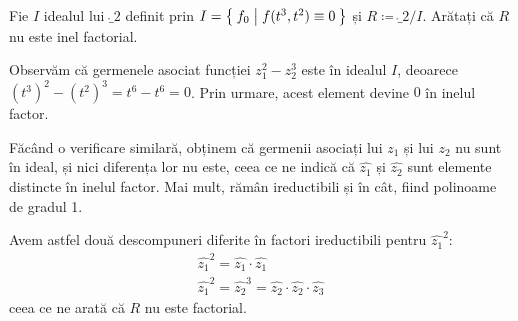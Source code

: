 \begin{problem}
Fie \(I\) idealul lui \(\ring_2\) definit prin \(I = \Set{ f_0 | f(t^3, t^2) \equiv 0 }\) și \(R \coloneq \ring_2 / I\). Arătați că \(R\) nu este inel factorial.
\end{problem}
\begin{solution}
Observăm că germenele asociat funcției \(z_1^2 - z_2^3\) este în idealul \(I\), deoarece \((t^3)^2 - (t^2)^3 = t^6 - t^6 = 0\). Prin urmare, acest element devine \(0\) în inelul factor.

Făcând o verificare similară, obținem că germenii asociați lui \(z_1\) și lui \(z_2\) nu sunt în ideal, și nici diferența lor nu este, ceea ce ne indică că \(\widehat{z_1}\) și \(\widehat{z_2}\) sunt elemente distincte în inelul factor. Mai mult, rămân ireductibili și în cât, fiind polinoame de gradul 1.

Avem astfel două descompuneri diferite în factori ireductibili pentru \(\widehat{z_1}^2\):
\begin{gather*}
    \widehat{z_1}^2 = \widehat{z_1} \cdot \widehat{z_1} \\
    \widehat{z_1}^2 = \widehat{z_2}^3 = \widehat{z_2} \cdot \widehat{z_2} \cdot \widehat{z_3}
\end{gather*}
ceea ce ne arată că \(R\) nu este factorial.
\end{solution}

\begin{comment}
\begin{problem}
Arătați că \(x^2 + y^4 (1 + x)\) este ireductibil în \(\complex[x, y]\) dar reductibil în \(\ring_2\).
\end{problem}
\end{comment}